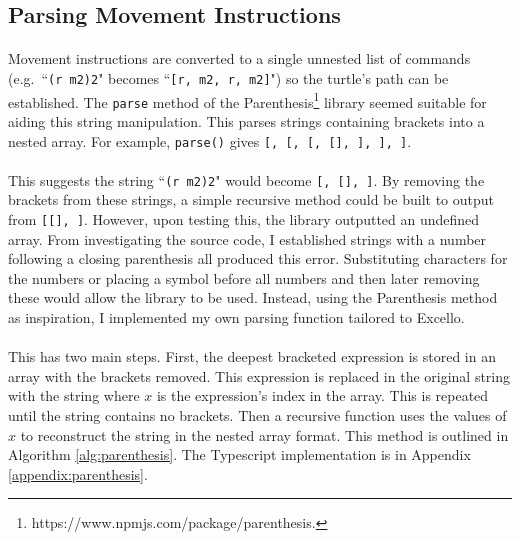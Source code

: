 \subsection{Parsing Movement Instructions}

\paragraph{} Movement instructions are converted to a single unnested list of commands (e.g.~``\texttt{(r m2)2}" becomes ``\texttt{[r, m2, r, m2]}") so the turtle's path can be established. The \texttt{parse} method of the Parenthesis\footnote{https://www.npmjs.com/package/parenthesis.} library seemed suitable for aiding this string manipulation. This parses strings containing brackets into a nested array. For example, \texttt{parse(\textcolor[rgb]{0,0.7,0}{})} gives \texttt{[\textcolor[rgb]{0,0.7,0}{}, [\textcolor[rgb]{0,0.7,0}{\upquote{b[}}, [\textcolor[rgb]{0,0.7,0}{}, [\textcolor[rgb]{0,0.7,0}{}], \textcolor[rgb]{0,0.7,0}{\upquote{\}}}], \textcolor[rgb]{0,0.7,0}{\upquote{]}}], \textcolor[rgb]{0,0.7,0}{\upquote{)}}]}.

\paragraph{} This suggests the string ``\texttt{(r m2)2}" would become \texttt{[\upquote{(}, [], ]}.  By removing the brackets from these strings, a simple recursive method could be built to output \texttt{} from \texttt{[[], ]}. However, upon testing this, the library outputted an undefined array. From investigating the source code, I established strings with a number following a closing parenthesis all produced this error. Substituting characters for the numbers or placing a symbol before all numbers and then later removing these would allow the library to be used. Instead, using the Parenthesis method as inspiration, I implemented my own parsing function tailored to Excello.

\paragraph{} This has two main steps. First, the deepest bracketed expression is stored in an array with the brackets removed. This expression is replaced in the original string with the string  where $x$ is the expression's index in the array. This is repeated until the string contains no brackets. Then a recursive function uses the values of $x$ to reconstruct the string in the nested array format. This method is outlined in Algorithm \ref{alg:parenthesis}. The Typescript implementation is in Appendix \ref{appendix:parenthesis}.

